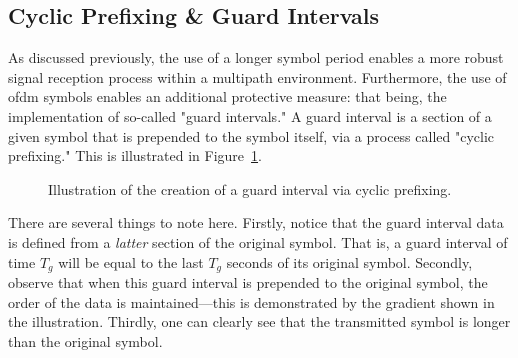 \documentclass[class=report,11pt,crop=false]{standalone}
\begin{document}
\subsection{Cyclic Prefixing \& Guard Intervals}
As discussed previously, the use of a longer symbol period enables a more robust signal reception process within a multipath environment. Furthermore, the use of \gls{ofdm} symbols enables an additional protective measure: that being, the implementation of so-called "guard intervals." A guard interval is a section of a given symbol that is prepended to the symbol itself, via a process called "cyclic prefixing." This is illustrated in Figure~\ref{fig:cyclic-prefix}.
\begin{figure}[htbp]
    \centering
    \captionsetup{type=figure}
    \def\svgwidth{1\linewidth}
    { %
        }
    \caption{Illustration of the creation of a guard interval via cyclic prefixing.}
    \label{fig:cyclic-prefix}
\end{figure}
There are several things to note here. Firstly, notice that the guard interval data is defined from a \emph{latter} section of the original symbol. That is, a guard interval of time \(T_g\) will be equal to the last \(T_g\) seconds of its original symbol. Secondly, observe that when this guard interval is prepended to the original symbol, the order of the data is maintained---this is demonstrated by the gradient shown in the illustration. Thirdly, one can clearly see that the transmitted symbol is longer than the original symbol.
\end{document}
